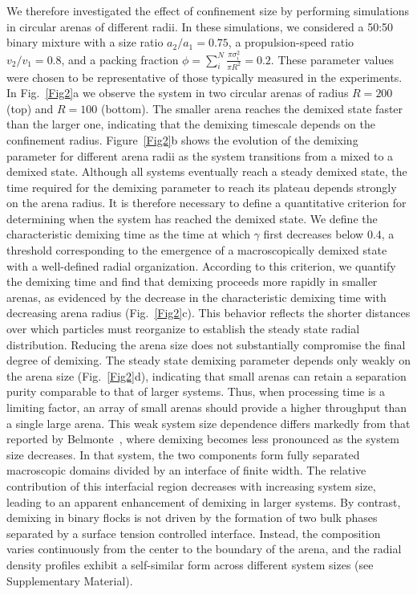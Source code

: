 \documentclass[aps,pre,twocolumn,amsmath,amssymb,notitlepage,superscriptaddress,longbibliography,nofootinbib,10pt]{revtex4-1}
\begin{document}
We therefore investigated the effect of confinement size by performing simulations in circular arenas of different radii. In these simulations, we considered a 50:50 binary mixture with a size ratio $a_2/a_1 = 0.75$, a propulsion-speed ratio $v_2/v_1 = 0.8$, and a packing fraction $\phi = \sum_{i}^{N} \frac{\pi \sigma_{i}^2}{\pi R^2} =0.2$. These parameter values were chosen to be representative of those typically measured in the experiments. In Fig.~\ref{Fig2}a we observe the system in two circular arenas of radius $R = 200$ (top) and $R = 100$ (bottom). The smaller arena reaches the demixed state faster than the larger one, indicating that the demixing timescale depends on the confinement radius. Figure~\ref{Fig2}b shows the evolution of the demixing parameter for different arena radii as the system transitions from a mixed to a demixed state. Although all systems eventually reach a steady demixed state, the time required for the demixing parameter to reach its plateau depends strongly on the arena radius. It is therefore necessary to define a quantitative criterion for determining when the system has reached the demixed state. We define the characteristic demixing time as the time at which $\gamma$ first decreases below $0.4$, a threshold corresponding to the emergence of a macroscopically demixed state with a well-defined radial organization. According to this criterion, we quantify the demixing time and find that demixing proceeds more rapidly in smaller arenas, as evidenced by the decrease in the characteristic demixing time with decreasing arena radius (Fig.~\ref{Fig2}c). This behavior reflects the shorter distances over which particles must reorganize to establish the steady state radial distribution.
Reducing the arena size does not substantially compromise the final degree of demixing. The steady state demixing parameter depends only weakly on the arena size (Fig.~\ref{Fig2}d), indicating that small arenas can retain a separation purity comparable to that of larger systems. Thus, when processing time is a limiting factor, an array of small arenas should provide a higher throughput than a single large arena.
This weak system size dependence differs markedly from that reported by Belmonte~\cite{PhysRevLett.100.248702}, where demixing becomes less pronounced as the system size decreases. In that system, the two components form fully separated macroscopic domains divided by an interface of finite width. The relative contribution of this interfacial region decreases with increasing system size, leading to an apparent enhancement of demixing in larger systems. By contrast, demixing in binary flocks is not driven by the formation of two bulk phases separated by a surface tension controlled interface. Instead, the composition varies continuously from the center to the boundary of the arena, and the radial density profiles exhibit a self-similar form across different system sizes (see Supplementary Material).
\end{document}
